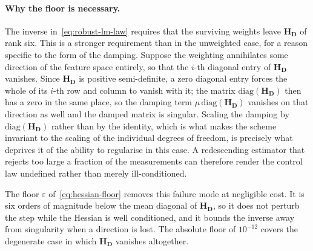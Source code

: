 \paragraph{Why the floor is necessary.}
The inverse in~\eqref{eq:robust-lm-law} requires that the surviving weights
leave $\mathbf{H}_{\mathbf{D}}$ of rank six. This is a stronger requirement
than in the unweighted case, for a reason specific to the form of the damping.
Suppose the weighting annihilates some direction of the feature space
entirely, so that the $i$-th diagonal entry of $\mathbf{H}_{\mathbf{D}}$
vanishes. Since $\mathbf{H}_{\mathbf{D}}$ is positive semi-definite, a zero
diagonal entry forces the whole of its $i$-th row and column to vanish with
it; the matrix $\mathrm{diag}(\mathbf{H}_{\mathbf{D}})$ then has a zero in the
same place, so the damping term $\mu\,\mathrm{diag}(\mathbf{H}_{\mathbf{D}})$
vanishes on that direction as well and the damped matrix is singular. Scaling
the damping by $\mathrm{diag}(\mathbf{H}_{\mathbf{D}})$ rather than by the
identity, which is what makes the scheme invariant to the scaling of the
individual degrees of freedom, is precisely what deprives it of the ability to
regularise in this case. A redescending estimator that rejects too large a
fraction of the measurements can therefore render the control law undefined
rather than merely ill-conditioned.

The floor $\varepsilon$ of~\eqref{eq:hessian-floor} removes this failure mode
at negligible cost. It is six orders of magnitude below the mean diagonal of
$\mathbf{H}_{\mathbf{D}}$, so it does not perturb the step while the Hessian
is well conditioned, and it bounds the inverse away from singularity when a
direction is lost. The absolute floor of $10^{-12}$ covers the degenerate case
in which $\mathbf{H}_{\mathbf{D}}$ vanishes altogether.


